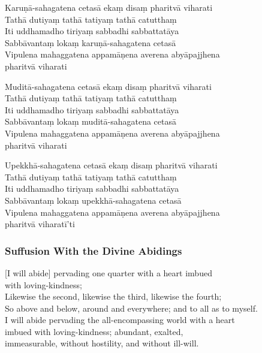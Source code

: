 Karuṇā-sahagatena cetasā ekaṃ disaṃ pharitvā viharati\\
Tathā dutiyaṃ tathā tatiyaṃ tathā catutthaṃ\\
Iti uddhamadho tiriyaṃ sabbadhi sabbattatāya\\
Sabbāvantaṃ lokaṃ karuṇā-sahagatena cetasā\\
Vipulena mahaggatena appamāṇena averena abyāpajjhena\\
\vin pharitvā viharati

Muditā-sahagatena cetasā ekaṃ disaṃ pharitvā viharati\\
Tathā dutiyaṃ tathā tatiyaṃ tathā catutthaṃ\\
Iti uddhamadho tiriyaṃ sabbadhi sabbattatāya\\
Sabbāvantaṃ lokaṃ muditā-sahagatena cetasā\\
Vipulena mahaggatena appamāṇena averena abyāpajjhena\\
\vin pharitvā viharati

Upekkhā-sahagatena cetasā ekaṃ disaṃ pharitvā viharati\\
Tathā dutiyaṃ tathā tatiyaṃ tathā catutthaṃ\\
Iti uddhamadho tiriyaṃ sabbadhi sabbattatāya\\
Sabbāvantaṃ lokaṃ upekkhā-sahagatena cetasā\\
Vipulena mahaggatena appamāṇena averena abyāpajjhena\\
\vin pharitvā viharatī'ti


\subsubsection{Suffusion With the Divine Abidings}


\begin{leader}
\end{leader}

[I will abide] pervading one quarter with a heart imbued\\
\vin with loving-kindness;\\
Likewise the second, likewise the third, likewise the fourth;\\
So above and below, around and everywhere; and to all as to myself.\\
I will abide pervading the all-encompassing world with a heart \\
\vin imbued with loving-kindness; abundant, exalted,\\
\vin immeasurable, without hostility, and without ill-will.

